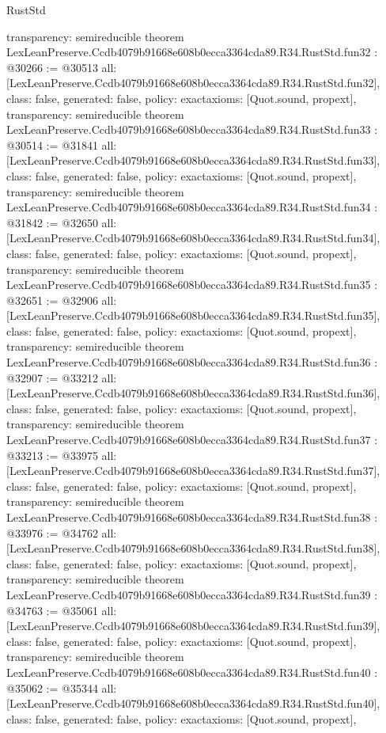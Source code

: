 \begin{lexlean}{RustStd}
\begin{coremodule}
{  transparency: semireducible
}
theorem LexLeanPreserve.Ccdb4079b91668e608b0ecca3364cda89.R34.RustStd.fun32 : @30266 := @30513 {
  all: [LexLeanPreserve.Ccdb4079b91668e608b0ecca3364cda89.R34.RustStd.fun32],
  class: false,
  generated: false,
  policy: exact{axioms: [Quot.sound, propext]},
  transparency: semireducible
}
theorem LexLeanPreserve.Ccdb4079b91668e608b0ecca3364cda89.R34.RustStd.fun33 : @30514 := @31841 {
  all: [LexLeanPreserve.Ccdb4079b91668e608b0ecca3364cda89.R34.RustStd.fun33],
  class: false,
  generated: false,
  policy: exact{axioms: [Quot.sound, propext]},
  transparency: semireducible
}
theorem LexLeanPreserve.Ccdb4079b91668e608b0ecca3364cda89.R34.RustStd.fun34 : @31842 := @32650 {
  all: [LexLeanPreserve.Ccdb4079b91668e608b0ecca3364cda89.R34.RustStd.fun34],
  class: false,
  generated: false,
  policy: exact{axioms: [Quot.sound, propext]},
  transparency: semireducible
}
theorem LexLeanPreserve.Ccdb4079b91668e608b0ecca3364cda89.R34.RustStd.fun35 : @32651 := @32906 {
  all: [LexLeanPreserve.Ccdb4079b91668e608b0ecca3364cda89.R34.RustStd.fun35],
  class: false,
  generated: false,
  policy: exact{axioms: [Quot.sound, propext]},
  transparency: semireducible
}
theorem LexLeanPreserve.Ccdb4079b91668e608b0ecca3364cda89.R34.RustStd.fun36 : @32907 := @33212 {
  all: [LexLeanPreserve.Ccdb4079b91668e608b0ecca3364cda89.R34.RustStd.fun36],
  class: false,
  generated: false,
  policy: exact{axioms: [Quot.sound, propext]},
  transparency: semireducible
}
theorem LexLeanPreserve.Ccdb4079b91668e608b0ecca3364cda89.R34.RustStd.fun37 : @33213 := @33975 {
  all: [LexLeanPreserve.Ccdb4079b91668e608b0ecca3364cda89.R34.RustStd.fun37],
  class: false,
  generated: false,
  policy: exact{axioms: [Quot.sound, propext]},
  transparency: semireducible
}
theorem LexLeanPreserve.Ccdb4079b91668e608b0ecca3364cda89.R34.RustStd.fun38 : @33976 := @34762 {
  all: [LexLeanPreserve.Ccdb4079b91668e608b0ecca3364cda89.R34.RustStd.fun38],
  class: false,
  generated: false,
  policy: exact{axioms: [Quot.sound, propext]},
  transparency: semireducible
}
theorem LexLeanPreserve.Ccdb4079b91668e608b0ecca3364cda89.R34.RustStd.fun39 : @34763 := @35061 {
  all: [LexLeanPreserve.Ccdb4079b91668e608b0ecca3364cda89.R34.RustStd.fun39],
  class: false,
  generated: false,
  policy: exact{axioms: [Quot.sound, propext]},
  transparency: semireducible
}
theorem LexLeanPreserve.Ccdb4079b91668e608b0ecca3364cda89.R34.RustStd.fun40 : @35062 := @35344 {
  all: [LexLeanPreserve.Ccdb4079b91668e608b0ecca3364cda89.R34.RustStd.fun40],
  class: false,
  generated: false,
  policy: exact{axioms: [Quot.sound, propext]},
}
\end{coremodule}
\end{lexlean}
